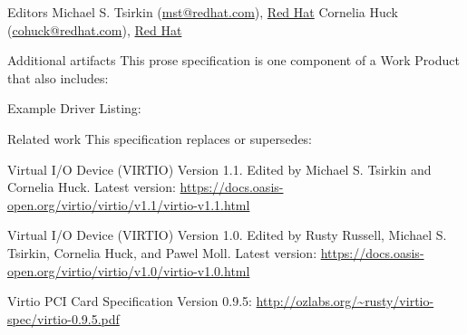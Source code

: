 \begin{titlepage}
\begin{oasistitlesection}{Editors}
Michael S. Tsirkin (\href{mailto:mst@redhat.com}{mst@redhat.com}), \href{https://www.redhat.com/}{Red Hat}\newline
Cornelia Huck (\href{mailto:cohuck@redhat.com}{cohuck@redhat.com}), \href{https://www.redhat.com/}{Red Hat}\newline
\end{oasistitlesection}


\begin{oasistitlesection}{Additional artifacts}
This prose specification is one component of a Work Product that also includes:
\begin{itemize*}
	\item Example Driver Listing: \newline
	\virtiourllistings
\end{itemize*}
\end{oasistitlesection}
\vspace{-0.2in}

\begin{oasistitlesection}{Related work}
This specification replaces or supersedes:
\begin{itemize*}
	\item Virtual I/O Device (VIRTIO) Version 1.1. Edited by Michael S. Tsirkin and Cornelia Huck. Latest version:\newline
	\url{https://docs.oasis-open.org/virtio/virtio/v1.1/virtio-v1.1.html}
	\item Virtual I/O Device (VIRTIO) Version 1.0. Edited by Rusty Russell, Michael S. Tsirkin, Cornelia Huck, and Pawel
 Moll. Latest version:\newline
	\url{https://docs.oasis-open.org/virtio/virtio/v1.0/virtio-v1.0.html}
	\item Virtio PCI Card Specification Version 0.9.5:\newline
	\url{http://ozlabs.org/~rusty/virtio-spec/virtio-0.9.5.pdf}
\end{itemize*}
\end{oasistitlesection}
\vspace{-0.2in}

\vfill\newpage


\end{titlepage}

